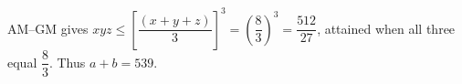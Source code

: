 AM--GM gives $xyz\le[\dfrac{(x+y+z)}{3}]^3=(\dfrac{8}{3})^3=\dfrac{512}{27}$, attained when all three equal $\dfrac{8}{3}$. Thus $a+b=\boxed{539}$.
